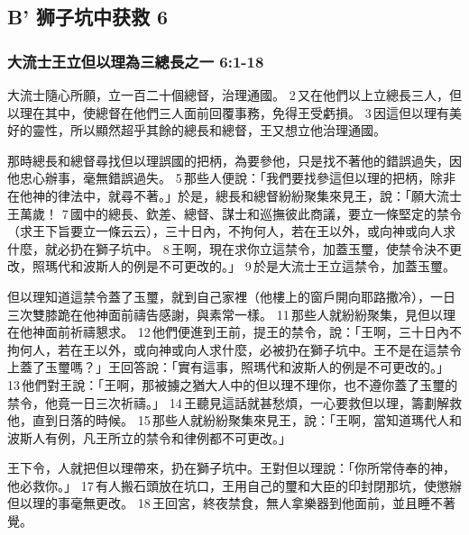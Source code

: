 \subsection{B' 狮子坑中获救 6}
\subsubsection{大流士王立但以理為三總長之一 6:1-18}
大流士隨心所願，立一百二十個總督，治理通國。 2 又在他們以上立總長三人，但以理在其中，使總督在他們三人面前回覆事務，免得王受虧損。 3 因這但以理有美好的靈性，所以顯然超乎其餘的總長和總督，王又想立他治理通國。

那時總長和總督尋找但以理誤國的把柄，為要參他，只是找不著他的錯誤過失，因他忠心辦事，毫無錯誤過失。 5 那些人便說：「我們要找參這但以理的把柄，除非在他神的律法中，就尋不著。」於是，總長和總督紛紛聚集來見王，說：「願大流士王萬歲！ 7 國中的總長、欽差、總督、謀士和巡撫彼此商議，要立一條堅定的禁令（求王下旨要立一條云云），三十日內，不拘何人，若在王以外，或向神或向人求什麼，就必扔在獅子坑中。 8 王啊，現在求你立這禁令，加蓋玉璽，使禁令決不更改，照瑪代和波斯人的例是不可更改的。」 9 於是大流士王立這禁令，加蓋玉璽。

但以理知道這禁令蓋了玉璽，就到自己家裡（他樓上的窗戶開向耶路撒冷），一日三次雙膝跪在他神面前禱告感謝，與素常一樣。 11 那些人就紛紛聚集，見但以理在他神面前祈禱懇求。 12 他們便進到王前，提王的禁令，說：「王啊，三十日內不拘何人，若在王以外，或向神或向人求什麼，必被扔在獅子坑中。王不是在這禁令上蓋了玉璽嗎？」王回答說：「實有這事，照瑪代和波斯人的例是不可更改的。」 13 他們對王說：「王啊，那被擄之猶大人中的但以理不理你，也不遵你蓋了玉璽的禁令，他竟一日三次祈禱。」 14 王聽見這話就甚愁煩，一心要救但以理，籌劃解救他，直到日落的時候。 15 那些人就紛紛聚集來見王，說：「王啊，當知道瑪代人和波斯人有例，凡王所立的禁令和律例都不可更改。」

王下令，人就把但以理帶來，扔在獅子坑中。王對但以理說：「你所常侍奉的神，他必救你。」 17 有人搬石頭放在坑口，王用自己的璽和大臣的印封閉那坑，使懲辦但以理的事毫無更改。 18 王回宮，終夜禁食，無人拿樂器到他面前，並且睡不著覺。

